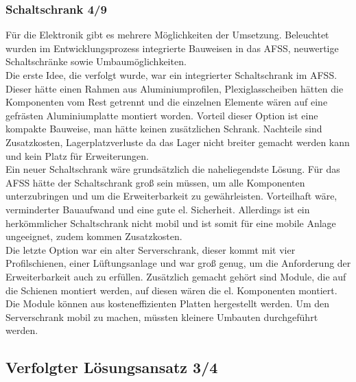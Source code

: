 \subsubsection{Schaltschrank 4/9}
Für die Elektronik gibt es mehrere Möglichkeiten der Umsetzung. Beleuchtet wurden im Entwicklungsprozess integrierte Bauweisen in das AFSS, neuwertige Schaltschränke sowie Umbaumöglichkeiten.\\
Die erste Idee, die verfolgt wurde, war ein integrierter Schaltschrank im AFSS. Dieser hätte einen Rahmen aus Aluminiumprofilen, Plexiglasscheiben hätten die Komponenten vom Rest getrennt und die einzelnen Elemente wären auf eine gefrästen Aluminiumplatte montiert worden. Vorteil dieser Option ist eine kompakte Bauweise, man hätte keinen zusätzlichen Schrank. Nachteile sind Zusatzkosten, Lagerplatzverluste da das Lager nicht breiter gemacht werden kann und kein Platz für Erweiterungen.\\
Ein neuer Schaltschrank wäre grundsätzlich die naheliegendste  Lösung. Für das AFSS hätte der Schaltschrank groß sein müssen, um alle Komponenten unterzubringen und um die Erweiterbarkeit zu gewährleisten. Vorteilhaft wäre, verminderter Bauaufwand und eine gute el. Sicherheit. Allerdings ist ein herkömmlicher Schaltschrank nicht mobil und ist somit für eine mobile Anlage ungeeignet, zudem kommen Zusatzkosten.\\	
Die letzte Option war ein alter Serverschrank, dieser kommt mit vier Profilschienen, einer Lüftungsanlage und war groß genug, um die Anforderung der Erweiterbarkeit auch zu erfüllen. Zusätzlich gemacht gehört sind Module, die auf die Schienen montiert werden, auf diesen wären die el. Komponenten montiert. Die Module können aus kosteneffizienten Platten hergestellt werden. Um den Serverschrank mobil zu machen, müssten kleinere Umbauten durchgeführt werden.




\subsection{Verfolgter Lösungsansatz 3/4}

